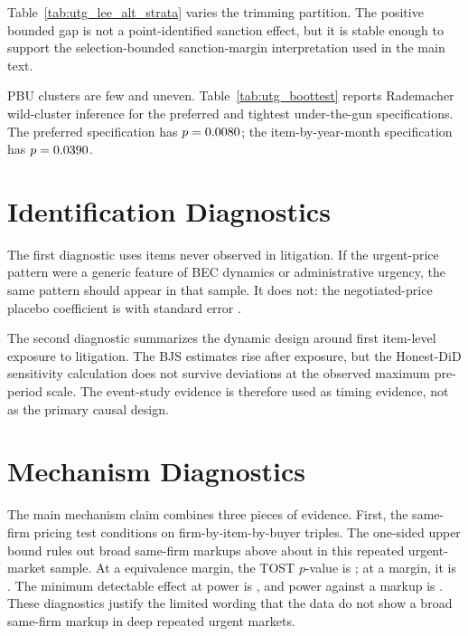 Table~\ref{tab:utg_lee_alt_strata} varies the trimming partition. The
positive bounded gap is not a point-identified sanction effect, but it
is stable enough to support the selection-bounded sanction-margin
interpretation used in the main text.



PBU clusters are few and uneven. Table~\ref{tab:utg_boottest} reports
Rademacher wild-cluster inference for the preferred and tightest
under-the-gun specifications. The preferred specification has
$p=0.0080{}$; the item-by-year-month specification has
$p=0.0390{}$.

\section{Identification Diagnostics}
\label{app:diagnostics}

The first diagnostic uses items never observed in litigation. If the
urgent-price pattern were a generic feature of BEC dynamics or
administrative urgency, the same pattern should appear in that sample.
It does not: the negotiated-price placebo coefficient is
\BPplaceboNegCoef{} with standard error \BPplaceboNegSE{}.



The second diagnostic summarizes the dynamic design around first
item-level exposure to litigation. The BJS estimates rise after
exposure, but the Honest-DiD sensitivity calculation does not survive
deviations at the observed maximum pre-period scale. The event-study
evidence is therefore used as timing evidence, not as the primary
causal design.



\section{Mechanism Diagnostics}
\label{app:mechanisms}

The main mechanism claim combines three pieces of evidence. First, the
same-firm pricing test conditions on firm-by-item-by-buyer triples.
The one-sided upper \BPwfCILevelPct{} bound rules out broad same-firm markups above
about \BPwfNullRuleOutPct{} in this repeated urgent-market sample. At
a \BPwfTostMarginPct{} equivalence margin, the TOST $p$-value is
\BPwfTostPten{}; at a \BPwfTostMarginPctAlt{} margin, it is \BPwfTostPfive{}. The minimum
detectable effect at \BPwfPowerLevelPct{} power is \BPwfNullMdePct{}, and power
against a \BPwfTostMarginPct{} markup is \BPwfNullPowerTen{}. These diagnostics justify
the limited wording that the data do not show a broad same-firm markup
in deep repeated urgent markets.

